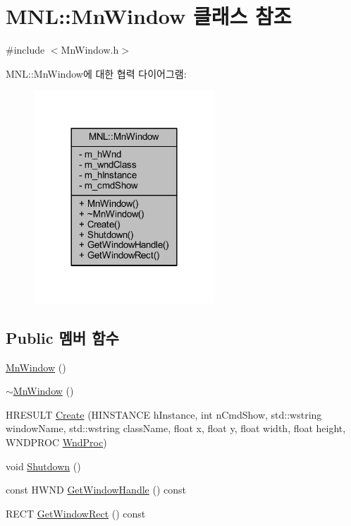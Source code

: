 \hypertarget{class_m_n_l_1_1_mn_window}{}\section{M\+NL\+:\+:Mn\+Window 클래스 참조}
\label{class_m_n_l_1_1_mn_window}


{\ttfamily \#include $<$Mn\+Window.\+h$>$}



M\+NL\+:\+:Mn\+Window에 대한 협력 다이어그램\+:\nopagebreak
\begin{figure}[H]
\begin{center}
\leavevmode
\includegraphics[width=192pt]{class_m_n_l_1_1_mn_window__coll__graph}
\end{center}
\end{figure}
\subsection*{Public 멤버 함수}
\begin{DoxyCompactItemize}
\item 
\hyperlink{class_m_n_l_1_1_mn_window_abf8973f11c6633e9d068abb26e7030a1}{Mn\+Window} ()
\item 
\hyperlink{class_m_n_l_1_1_mn_window_a180fc3e3ef072d8842de655b2aa8ea1c}{$\sim$\+Mn\+Window} ()
\item 
H\+R\+E\+S\+U\+LT \hyperlink{class_m_n_l_1_1_mn_window_aaa2478013ccab0097369c641b5f6a62e}{Create} (H\+I\+N\+S\+T\+A\+N\+CE h\+Instance, int n\+Cmd\+Show, std\+::wstring window\+Name, std\+::wstring class\+Name, float x, float y, float width, float height, W\+N\+D\+P\+R\+OC \hyperlink{main_8cpp_ac996a0edf7f6d6736f7f2920665a453d}{Wnd\+Proc})
\item 
void \hyperlink{class_m_n_l_1_1_mn_window_a1f403818d6bcf6b50d15ea7dffbbdde6}{Shutdown} ()
\item 
const H\+W\+ND \hyperlink{class_m_n_l_1_1_mn_window_abd7d89c761943fe7d1752bd75322b6dd}{Get\+Window\+Handle} () const
\item 
R\+E\+CT \hyperlink{class_m_n_l_1_1_mn_window_a3d3700567955d10c1f95f39c55f3831b}{Get\+Window\+Rect} () const
\end{DoxyCompactItemize}
